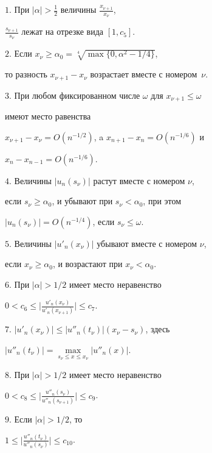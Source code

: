 \begin{lem}


$1$. При $|\alpha|>\frac12$ величины $\frac{x_{\nu+1}}{x_\nu}$,  


$\frac{s_{\nu+1}}{s_\nu}$ лежат на отрезке вида $[1,c_5]$. 





$2$. Если ${x_\nu}\geq\alpha_0=\sqrt[4]{\max\{0,\alpha^2-1/4\}}$,


то разность $x_{\nu+1}-x_\nu$ возрастает вместе с номером~$\nu$. 





$3$. При любом фиксированном числе $\omega$ для $x_{\nu+1}\leq\omega$ 


имеют место равенства


$x_{\nu+1}-x_\nu=O(n^{-1/2})$, a $x_{n+1}-x_n=O(n^{-1/6})$ и 


$x_n-x_{n-1}=O(n^{-1/6})$.





$4$. Величины $|u_n(s_\nu)|$ растут вместе с номером $\nu$, 


если $s_\nu\geq\alpha_0$, и убывают при $s_\nu <\alpha_0$, при этом


$|u_n(s_\nu)|=O(n^{-1/4})$, если $s_\nu\leq\omega$.





$5$. Величины $|u'_n(x_\nu)|$ убывают вместе с номером $\nu$, 


если $x_\nu\geq\alpha_0$, и возрастают при $x_\nu <\alpha_0$. 





$6$. При $|\alpha|>{1/2}$ имеет место неравенство


$0<c_6\leq\big|\frac{u'_n(x_\nu)}{u'_n(x_{\nu+1})}\big|\leq c_7$.





$7$. $|u'_n(x_\nu)|\leq


|u''_n(t_\nu)|(x_\nu-s_\nu)$, здесь


$|u''_n(t_\nu)|=\max\limits_{s_\nu\leq x\leq x_\nu}


|u''_n(x)|$.





$8$. При $|\alpha|>{1/2}$ имеет место неравенство


$0<c_8\leq\big|\frac{u''_n(s_\nu)}


{u''_n(s_{\nu+1})}\big|\leq c_9$.





$9$. Если $|\alpha|>{1/2}$, то 


$1\leq\big|\frac{u''_n(t_\nu)}


{u''_n(s_\nu)}|\leq c_{10}$.


\end{lem}





